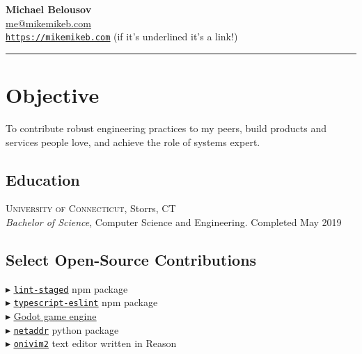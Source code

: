 \documentclass[Letterpaper,11pt]{article}
\newcommand\bul{$\blacktriangleright$ }
\newcommand\link[2]{\href{#1}{\underline{#2}}}
\begin{document}
\setlength{\parindent}{0em}
\setlength{\parskip}{1em}
\setlength{\parsep}{1em}
\setlength{\itemsep}{0.2em}
\setlength{\headsep}{0.2em}
\setlength{\topskip}{0.2em}
\setlength{\topmargin}{0.2em}
\setlength{\topsep}{0.2em}
\setlength{\partopsep}{0.2em}
\setlength{\columnsep}{1em}

\addtolength{\topmargin}{-4em}

\textbf{\Large Michael Belousov}\\
\link{mailto:mikemikeb@protonmail.com}{me@mikemikeb.com}\\
\link{https://mikemikeb.com}{\texttt{https://mikemikeb.com}} (if it's underlined it's a link!)
\vspace{0.5em} %
\hrule
\vspace{0.5em} %

\section*{Objective}

To contribute robust engineering practices to my peers,
build products and services people love,
and achieve the role of systems expert.

\begin{multicols}{2}

    \section*{Education}
        \textsc{University of Connecticut}, Storrs, CT\\
        \textit{Bachelor of Science}, Computer Science and Engineering. Completed May 2019\\

    \subsection*{Select Open-Source Contributions}
        \bul \link{https://github.com/okonet/lint-staged}{\texttt{lint-staged}} npm package
        \\
        \bul \link{https://github.com/typescript-eslint/typescript-eslint}{\texttt{typescript-eslint}} npm package
        \\
        \bul \link{https://github.com/godotengine/godot}{Godot game engine}
        \\
        \bul \link{https://github.com/netaddr/netaddr}{\texttt{netaddr}} python package
        \\
        \bul \link{https://github.com/onivim/oni2/pull/2630}{\texttt{onivim2}} text editor written in Reason



\end{multicols}
\end{document}
